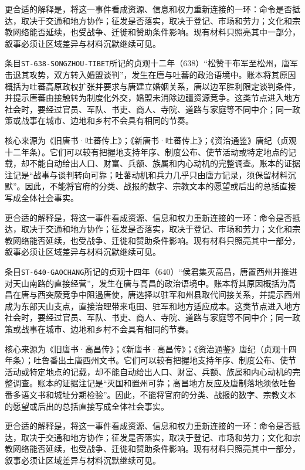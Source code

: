 更合适的解释是，将这一事件看成资源、信息和权力重新连接的一环：命令是否抵达，取决于交通和地方协作；征发是否落实，取决于登记、市场和劳力；文化和宗教网络能否延续，也受战争、迁徙和赞助条件影响。现有材料只照亮其中一部分，叙事必须让区域差异与材料沉默继续可见。

条目\texttt{ST-638-SONGZHOU-TIBET}所记的贞观十二年（638）“松赞干布军至松州，唐军击退其攻势，双方转入婚盟谈判”，发生在唐与吐蕃的政治语境中。账本将其原因概括为吐蕃高原政权扩张并要求与唐建立婚姻关系，唐以边军胜利限定谈判条件，并提示唐蕃由接触转为制度化外交，婚盟未消除边疆资源竞争。这类节点进入地方社会时，要经过官员、军队、书吏、商人、寺院、道路与家庭等不同中介；同一政策或战事在城市、边地和乡村不会具有相同的节奏。

核心来源为《旧唐书·吐蕃传上》；《新唐书·吐蕃传上》；《资治通鉴》唐纪（贞观十二年条）。它们可以较有把握地支持年序、制度公布、使节活动或特定地点的记载，却不能自动给出人口、财富、兵额、族属和内心动机的完整调查。账本的证据注记是“战事与谈判转向可靠；吐蕃动机和兵力几乎只由唐方记录，须保留材料沉默”。因此，不能将官府的分类、战报的数字、宗教文本的愿望或后出的总括直接写成全体社会事实。

更合适的解释是，将这一事件看成资源、信息和权力重新连接的一环：命令是否抵达，取决于交通和地方协作；征发是否落实，取决于登记、市场和劳力；文化和宗教网络能否延续，也受战争、迁徙和赞助条件影响。现有材料只照亮其中一部分，叙事必须让区域差异与材料沉默继续可见。

条目\texttt{ST-640-GAOCHANG}所记的贞观十四年（640）“侯君集灭高昌，唐置西州并推进对天山南路的直接经营”，发生在唐与高昌的政治语境中。账本将其原因概括为高昌在唐与西突厥竞争中阻遏唐使，唐选择以驻军和州县取代间接关系，并提示西州成为东部天山支点，直接治理带来屯田、驻军和地方适应成本。这类节点进入地方社会时，要经过官员、军队、书吏、商人、寺院、道路与家庭等不同中介；同一政策或战事在城市、边地和乡村不会具有相同的节奏。

核心来源为《旧唐书·高昌传》；《新唐书·高昌传》；《资治通鉴》唐纪（贞观十四年条）；吐鲁番出土唐西州文书。它们可以较有把握地支持年序、制度公布、使节活动或特定地点的记载，却不能自动给出人口、财富、兵额、族属和内心动机的完整调查。账本的证据注记是“灭国和置州可靠；高昌地方反应及唐制落地须依吐鲁番多语文书和城址分期检验”。因此，不能将官府的分类、战报的数字、宗教文本的愿望或后出的总括直接写成全体社会事实。

更合适的解释是，将这一事件看成资源、信息和权力重新连接的一环：命令是否抵达，取决于交通和地方协作；征发是否落实，取决于登记、市场和劳力；文化和宗教网络能否延续，也受战争、迁徙和赞助条件影响。现有材料只照亮其中一部分，叙事必须让区域差异与材料沉默继续可见。

